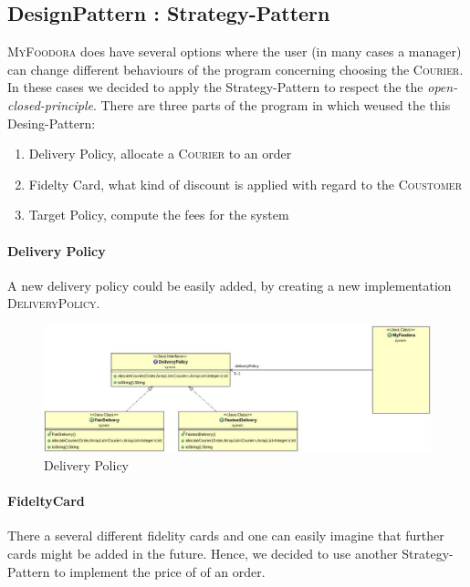\subsection{DesignPattern : Strategy-Pattern}
\label{sub:designpattern_strategy_pattern}

\textsc{MyFoodora} does have several options where the user (in many cases a manager) can change
different behaviours of the program concerning choosing the \textsc{Courier}. In these
cases we decided to apply the Strategy-Pattern to respect the the \textit{open-closed-principle}.
There are three parts of the program in which weused the this Desing-Pattern:
\begin{enumerate}
	\item Delivery Policy, allocate a \textsc{Courier} to an order
	\item Fidelty Card, what kind of discount is applied with regard to the
		\textsc{Coustomer}
	\item Target Policy, compute the fees for the system 
\end{enumerate}

\paragraph{Delivery Policy}
\label{par:delivery_policy}
A new delivery policy could be easily added, by creating a new implementation
\textsc{DeliveryPolicy}.

\begin{figure}[H]
	\centering
	\includegraphics[width=0.8\linewidth]{./ima/deliverypolicy.jpg}
	\caption{Delivery Policy}
	\label{fig:deliveryPolicy}
\end{figure}

\paragraph{FideltyCard}
\label{par:fideltycard}

There a several different fidelity cards and one can easily imagine that further cards might be 
added in the future. Hence, we decided to use another Strategy-Pattern to implement the price of
of an order. 

